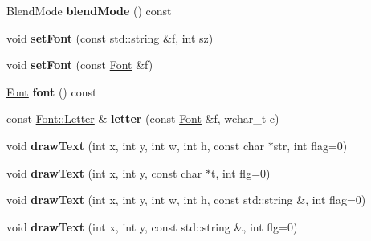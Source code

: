 \begin{DoxyCompactItemize}
\item 
\hypertarget{class_tempest_1_1_painter_a2354207b5e63510ad9a31512c821a4a9}{Blend\+Mode {\bfseries blend\+Mode} () const }\label{class_tempest_1_1_painter_a2354207b5e63510ad9a31512c821a4a9}

\item 
\hypertarget{class_tempest_1_1_painter_a4aadb6c886833b65237d880aa4e1113c}{void {\bfseries set\+Font} (const std\+::string \&f, int sz)}\label{class_tempest_1_1_painter_a4aadb6c886833b65237d880aa4e1113c}

\item 
\hypertarget{class_tempest_1_1_painter_afa6b7d696b6c96dbffd6b2b497f11e35}{void {\bfseries set\+Font} (const \hyperlink{class_tempest_1_1_font}{Font} \&f)}\label{class_tempest_1_1_painter_afa6b7d696b6c96dbffd6b2b497f11e35}

\item 
\hypertarget{class_tempest_1_1_painter_a647ec6316aa4407e86d962e813df5345}{\hyperlink{class_tempest_1_1_font}{Font} {\bfseries font} () const }\label{class_tempest_1_1_painter_a647ec6316aa4407e86d962e813df5345}

\item 
\hypertarget{class_tempest_1_1_painter_a6795cafd221056a2a93c7de1a9fdd0c6}{const \hyperlink{struct_tempest_1_1_font_element_1_1_letter}{Font\+::\+Letter} \& {\bfseries letter} (const \hyperlink{class_tempest_1_1_font}{Font} \&f, wchar\+\_\+t c)}\label{class_tempest_1_1_painter_a6795cafd221056a2a93c7de1a9fdd0c6}

\item 
\hypertarget{class_tempest_1_1_painter_ad08e68511c7ba007537189604306e39c}{void {\bfseries draw\+Text} (int x, int y, int w, int h, const char $\ast$str, int flag=0)}\label{class_tempest_1_1_painter_ad08e68511c7ba007537189604306e39c}

\item 
\hypertarget{class_tempest_1_1_painter_a69a0f1da6f6007291fff644e4cd96fee}{void {\bfseries draw\+Text} (int x, int y, const char $\ast$t, int flg=0)}\label{class_tempest_1_1_painter_a69a0f1da6f6007291fff644e4cd96fee}

\item 
\hypertarget{class_tempest_1_1_painter_ad74e436f482ddd98c4f958b5043cbcd6}{void {\bfseries draw\+Text} (int x, int y, int w, int h, const std\+::string \&, int flag=0)}\label{class_tempest_1_1_painter_ad74e436f482ddd98c4f958b5043cbcd6}

\item 
\hypertarget{class_tempest_1_1_painter_afbce918a6d57535be7f74e5ba1a3254c}{void {\bfseries draw\+Text} (int x, int y, const std\+::string \&, int flg=0)}\label{class_tempest_1_1_painter_afbce918a6d57535be7f74e5ba1a3254c}


\end{DoxyCompactItemize}
